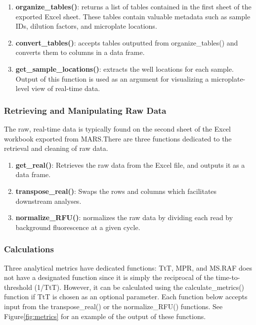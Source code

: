 \documentclass[preprint,12pt,a4paper]{elsarticle}
\providecommand{\DIFaddtex}[1]{{\protect\color{blue}\uwave{#1}}} %
\providecommand{\DIFaddbegin}{} %
\providecommand{\DIFaddend}{} %
\providecommand{\DIFadd}[1]{\texorpdfstring{\DIFaddtex{#1}}{#1}} %
\begin{document}
                \begin{enumerate}
                    \item \textbf{organize\_tables()}: returns a list of tables contained in the first sheet of the exported Excel sheet. These tables contain valuable metadata such as sample IDs, dilution factors, and microplate locations.
                    \item \textbf{convert\_tables()}: accepts tables outputted from organize\_tables() and converts them to columns in a data frame.
                    \item \textbf{get\_sample\_locations()}: extracts the well locations for each sample. Output of this function is used as an argument for visualizing a microplate-level view of real-time data.
                \end{enumerate}

            \subsubsection{Retrieving and Manipulating Raw Data}
                The raw, real-time data is typically found on the second sheet of the Excel workbook exported from MARS.\DIFaddbegin \DIFadd{\ }\DIFaddend There are three functions dedicated to the retrieval and cleaning of raw data.

                \begin{enumerate}
                    \item \textbf{get\_real()}: Retrieves the raw data from the Excel file, and outputs it as a data frame.
                    \item \textbf{transpose\_real()}: Swaps the rows and columns which facilitates downstream analyses.
                    \item \textbf{normalize\_RFU()}: normalizes the raw data by dividing each read by background fluorescence at a given cycle.
                \end{enumerate}

            \subsubsection{Calculations}
                Three analytical metrics have dedicated functions: TtT, MPR, and MS.\DIFaddbegin \DIFadd{\ }\DIFaddend RAF does not have a designated function since it is simply the reciprocal of the time-to-threshold (1/TtT). However, it can be calculated using the calculate\_metrics() function if TtT is chosen as an optional parameter. Each function below accepts input from the transpose\_real() or the normalize\_RFU() functions. See Figure\DIFaddbegin \DIFadd{~}\DIFaddend \ref{fig:metrics} for an example of the output of these functions.
\end{document}
